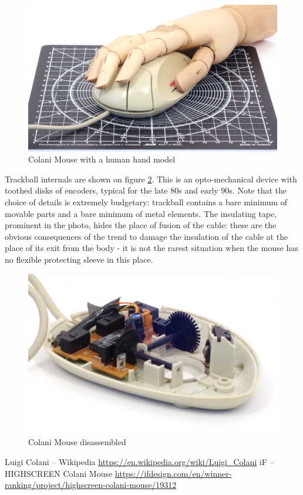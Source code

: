 \documentclass[11pt, a4paper]{article}
\begin{document}
\begin{figure}[h]
    \centering
    \includegraphics[scale=0.45]{1993_colani_mouse/hand_30.jpg}
    \caption{Colani Mouse with a human hand model}
    \label{fig:ColaniMouseHand}
\end{figure}

Trackball internals are shown on figure \ref{fig:ColaniMouseInside}. This is an opto-mechanical device with toothed disks of encoders, typical for the late 80s and early 90s. Note that the choice of details is extremely budgetary: trackball contains a bare minimum of movable parts and a bare minimum of metal elements. The insulating tape, prominent in the photo, hides the place of fusion of the cable: these are the obvious consequences of the trend to damage the insulation of the cable at the place of its exit from the body - it is not the rarest situation when the mouse has no flexible protecting sleeve in this place.

\begin{figure}[h]
    \centering
    \includegraphics[scale=0.9]{1993_colani_mouse/inside_60.jpg}
    \caption{Colani Mouse disassembled}
    \label{fig:ColaniMouseInside}
\end{figure}

\begin{thebibliography}{9}
     Luigi Colani – Wikipedia \url{https://en.wikipedia.org/wiki/Luigi_Colani}
     iF – HIGHSCREEN Colani Mouse \url{https://ifdesign.com/en/winner-ranking/project/highscreen-colani-mouse/19312}
\end{thebibliography}
\end{document}
